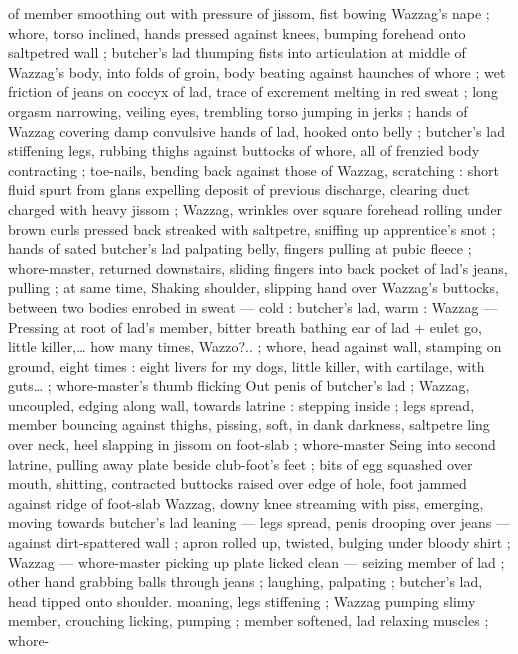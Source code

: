 of member smoothing out with pressure of jissom, fist bowing 
Wazzag's nape ; whore, torso inclined, hands pressed against knees, 
bumping forehead onto saltpetred wall ; butcher's lad thumping fists 
into articulation at middle of Wazzag's body, into folds of groin, body 
beating against haunches of whore ; wet friction of jeans on coccyx 
of lad, trace of excrement melting in red sweat ; long orgasm 
narrowing, veiling eyes, trembling torso jumping in jerks ; hands of 
Wazzag covering damp convulsive hands of lad, hooked onto belly ; 
butcher's lad stiffening legs, rubbing thighs against buttocks of 
whore, all of frenzied body contracting ; toe-nails, bending back 
against those of Wazzag, scratching : short fluid spurt from glans 
expelling deposit of previous discharge, clearing duct charged with 
heavy jissom ; Wazzag, wrinkles over square forehead rolling under 
brown curls pressed back streaked with saltpetre, sniffing up 
apprentice's snot ; hands of sated butcher's lad palpating belly, 
fingers pulling at pubic fleece ; whore-master, returned downstairs, 
sliding fingers into back pocket of lad's jeans, pulling ; at same time, 
Shaking shoulder, slipping hand over Wazzag's buttocks, between 
two bodies enrobed in sweat --- cold : butcher's lad, warm : Wazzag 
--- Pressing at root of lad's member, bitter breath bathing ear of lad 
+ eulet go, little killer,{\ldots} how many times, Wazzo?..{\gr} ; whore, head 
against wall, stamping on ground, eight times :{\td} {\gl} eight livers for my 
dogs, little killer, with cartilage, with guts{\ldots} {\gr} ; whore-master's thumb 
flicking Out penis of butcher's lad ; Wazzag, uncoupled, edging along 
wall, towards latrine : stepping inside ; legs spread, member 
bouncing against thighs, pissing, soft, in dank darkness, saltpetre 
ling over neck, heel slapping in jissom on foot-slab ; whore-master 
Seing into second latrine, pulling away plate beside club-foot's feet 
; bits of egg squashed over mouth, shitting, contracted buttocks 
raised over edge of hole, foot jammed against ridge of foot-slab 
Wazzag, downy knee streaming with piss, emerging, moving towards 
butcher's lad leaning --- legs spread, penis drooping over jeans --- 
against dirt-spattered wall ; apron rolled up, twisted, bulging under 
bloody shirt ; Wazzag --- whore-master picking up plate licked clean 
--- seizing member of lad ; other hand grabbing balls through jeans 
; laughing, palpating ; butcher's lad, head tipped onto shoulder. 
moaning, legs stiffening ; Wazzag pumping slimy member, crouching 
licking, pumping ; member softened, lad relaxing muscles ; whore- 
